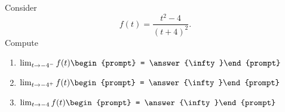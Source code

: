 \documentclass{ximera}
\author{Bart Snapp}
\begin{document}
\begin{exercise}
Consider 
\[
f(t) = \frac{t^2-4}{(t+4)^2}.
\]
Compute
\begin{enumerate}
\item $\lim_{t\to -4^- } f(t) \begin{prompt} = \answer{\infty}\end{prompt}$
\item $\lim_{t\to -4^+ } f(t) \begin{prompt} = \answer{\infty}\end{prompt}$
\item $\lim_{t\to -4 } f(t) \begin{prompt} = \answer{\infty}\end{prompt}$
\end{enumerate}
\end{exercise}
\end{document}
